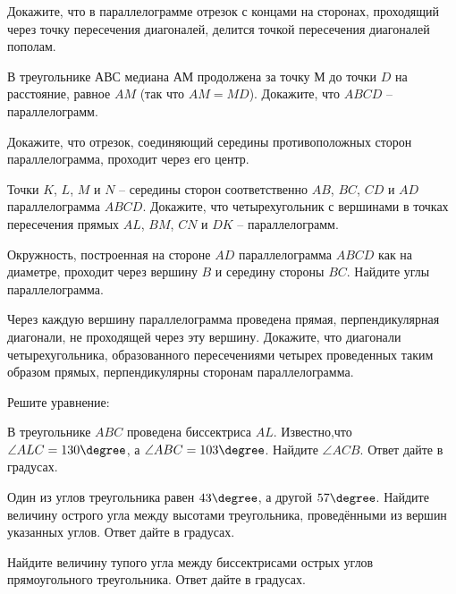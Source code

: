 %
%
\begin{class}[number=6]
	\begin{listofex}
		\item Докажите, что в параллелограмме отрезок с концами на сторонах, проходящий через точку пересечения диагоналей, делится точкой пересечения диагоналей пополам.
		\item В треугольнике \( АВС \) медиана \( АМ \) продолжена за точку \( М \) до точки \( D \) на расстояние, равное \( AM \) (так что \( AM=MD\)). Докажите, что \( ABCD \) -- параллелограмм.
		\item Докажите, что отрезок, соединяющий середины противоположных сторон параллелограмма, проходит через его центр.
		\item Точки \( K \), \( L \), \( M \) и \( N \) -- середины сторон соответственно \( AB \), \( BC \), \( CD \) и \( AD \) параллелограмма \( ABCD \). Докажите, что четырехугольник с вершинами в точках	пересечения прямых \( AL \), \( BM \), \( CN \) и \( DK \) -- параллелограмм.
		\item Окружность, построенная на стороне \( AD \) параллелограмма \( ABCD \) как на диаметре, проходит через вершину \( B \) и середину стороны \( BC \). Найдите углы параллелограмма.
		\item Через каждую вершину параллелограмма проведена прямая, перпендикулярная диагонали, не проходящей через эту вершину. Докажите, что диагонали четырехугольника, образованного пересечениями четырех проведенных таким образом прямых, перпендикулярны сторонам параллелограмма.
		\item Решите уравнение:
		\begin{enumcols}[itemcolumns=2]
			\item {}
			\item {}
			\item {}
			\item {}
		\end{enumcols}
	\end{listofex}
\end{class}
%
%
\begin{homework}[number=3]
	\begin{listofex}
		\item В треугольнике \( ABC \) проведена биссектриса \( AL \). Известно,что \( \angle ALC=130\degree \),
		а \( \angle ABC =103\degree \).
		Найдите \( \angle ACB \).
		Ответ дайте в градусах.
		\item Один из углов треугольника равен \( 43\degree \), а другой \( 57\degree \).
		Найдите величину острого угла между высотами треугольника,
		проведёнными из вершин указанных углов.
		Ответ дайте в градусах.
		\item Найдите величину тупого угла между биссектрисами острых
		углов прямоугольного треугольника. Ответ дайте в градусах.
	\end{listofex}
\end{homework}
%	
%

%
%	
